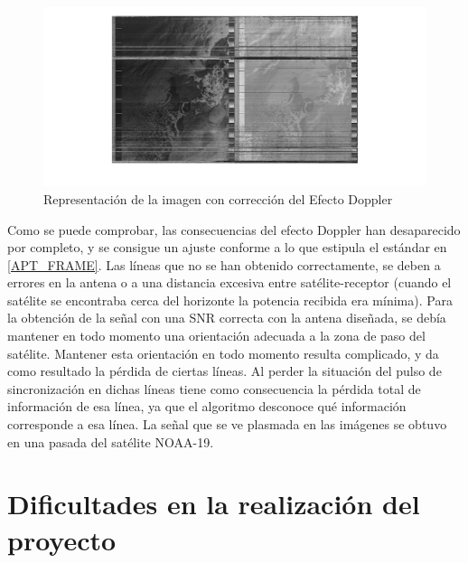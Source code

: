 \documentclass[a4paper,openright,12pt]{article}
\begin{document}
 \begin{figure}[hbtp]
 \centering
 \includegraphics[width = 17cm]{imagenes/apt_corrected.png}
 \caption{Representación de la imagen con corrección del Efecto Doppler}
 \label{apt_corrected}
 \end{figure}
 
 Como se puede comprobar, las consecuencias del efecto Doppler han desaparecido por completo, y se consigue un ajuste conforme a lo que estipula el estándar en \ref{APT_FRAME}. Las líneas que no se han obtenido correctamente, se deben a errores en la antena o a una distancia excesiva entre satélite-receptor (cuando el satélite se encontraba cerca del horizonte la potencia recibida era mínima). Para la obtención de la señal con una SNR correcta con la antena diseñada, se debía mantener en todo momento una orientación adecuada a la zona de paso del satélite. Mantener esta orientación en todo momento resulta complicado, y da como resultado la pérdida de ciertas líneas. Al perder la situación del pulso de sincronización en   dichas líneas tiene como consecuencia la pérdida total de información de esa línea, ya que el algoritmo desconoce qué información corresponde a esa línea. La señal que se ve plasmada en las imágenes se obtuvo en una pasada del satélite NOAA-19. 
 	

 

\section{Dificultades en la realización del proyecto}
\end{document}
